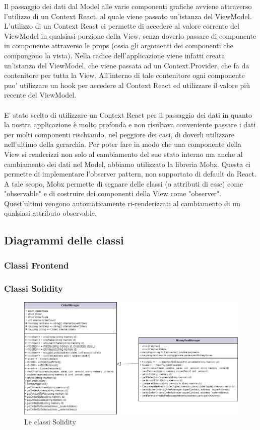 Il passaggio dei dati dal Model alle varie componenti grafiche avviene attraverso l'utilizzo di un Context
React, al quale viene passato un'istanza del ViewModel. L'utilizzo di un Context React ci permette di
accedere al valore corrente del ViewModel in qualsiasi porzione della View, senza doverlo passare di
componente in componente attraverso le props (ossia gli argomenti dei componenti che compongono la
vista). Nella radice dell'applicazione viene infatti creata un'istanza del ViewModel, che viene passata
ad un Context.Provider, che fa da contenitore per tutta la View. All'interno di tale contenitore ogni
componente puo' utilizzare un hook per accedere al Context React ed utilizzare il valore più recente del ViewModel.
\\
\\
E' stato scelto di utilizzare un Context React per il passaggio dei dati in quanto la nostra applicazione è
molto profonda e non risultava conveniente passare i dati per molti componenti rischiando, nel peggiore
dei casi, di doverli utilizzare nell'ultimo della gerarchia.
Per poter fare in modo che una componente della View si renderizzi non solo al cambiamento del
suo stato interno ma anche al cambiamento dei dati nel Model, abbiamo utilizzato la libreria Mobx.
Questa ci permette di implementare l'observer pattern, non supportato di default da React. A tale
scopo, Mobx permette di segnare delle classi (o attributi di esse) come "observable" e di costruire
dei componenti della View come "observer". Quest'ultimi vengono automaticamente ri-renderizzati al
cambiamento di un qualsiasi attributo observable.

\subsection{Diagrammi delle classi}

\subsubsection{Classi Frontend}

\subsubsection{Classi Solidity}

\begin{figure}[H]
    \centering
    \includegraphics[scale = 0.45]{immagini/smartcontract.png}
    \caption{Le classi Solidity}
\end{figure}

